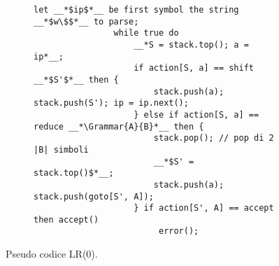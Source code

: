 \documentclass{subfiles}
\begin{document}
\begin{figure}[h!]
    \centering
    \begin{subfigure}[b]{0.7\textwidth}
        \begin{lstlisting}[language = PSEUDO]
                let __*$ip$*__ be first symbol the string __*$w\$$*__ to parse;
                while true do 
                    __*S = stack.top(); a = ip*__;
                    if action[S, a] == shift __*$S'$*__ then {
                        stack.push(a); stack.push(S'); ip = ip.next();
                    } else if action[S, a] == reduce __*\Grammar{A}{B}*__ then {
                        stack.pop(); // pop di 2 |B| simboli
                        __*$S' = stack.top()$*__;
                        stack.push(a); stack.push(goto[S', A]);
                    } if action[S', A] == accept then accept()
                         error();
            \end{lstlisting}
    \end{subfigure}
    \caption{Pseudo codice LR(0).}
    \label{fig:7}
\end{figure}
\end{document}
